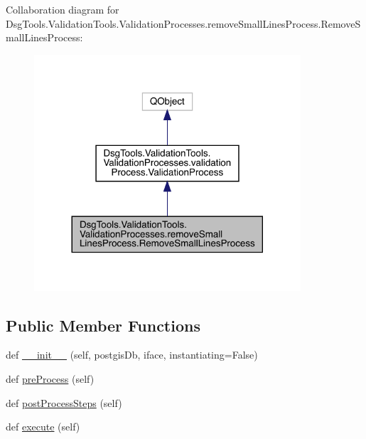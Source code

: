 Collaboration diagram for Dsg\+Tools.\+Validation\+Tools.\+Validation\+Processes.\+remove\+Small\+Lines\+Process.\+Remove\+Small\+Lines\+Process\+:
\nopagebreak
\begin{figure}[H]
\begin{center}
\leavevmode
\includegraphics[width=281pt]{class_dsg_tools_1_1_validation_tools_1_1_validation_processes_1_1remove_small_lines_process_1_1_f3553e0592d3a7f339f27a7e9200ef16}
\end{center}
\end{figure}
\subsection*{Public Member Functions}
\begin{DoxyCompactItemize}
\item 
def \mbox{\hyperlink{class_dsg_tools_1_1_validation_tools_1_1_validation_processes_1_1remove_small_lines_process_1_1_remove_small_lines_process_a6657aecde5121523b4e44e630b21d071}{\+\_\+\+\_\+init\+\_\+\+\_\+}} (self, postgis\+Db, iface, instantiating=False)
\item 
def \mbox{\hyperlink{class_dsg_tools_1_1_validation_tools_1_1_validation_processes_1_1remove_small_lines_process_1_1_remove_small_lines_process_afa39dbf71d0204049a936d28af5de1c3}{pre\+Process}} (self)
\item 
def \mbox{\hyperlink{class_dsg_tools_1_1_validation_tools_1_1_validation_processes_1_1remove_small_lines_process_1_1_remove_small_lines_process_a68919490a096b3c753a63e9497ee72d2}{post\+Process\+Steps}} (self)
\item 
def \mbox{\hyperlink{class_dsg_tools_1_1_validation_tools_1_1_validation_processes_1_1remove_small_lines_process_1_1_remove_small_lines_process_acddd79422fe90a9ebb6280c4015381d8}{execute}} (self)
\end{DoxyCompactItemize}
